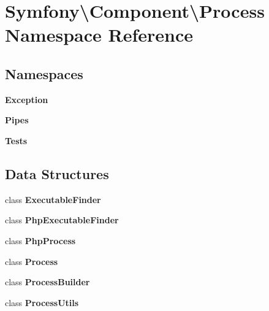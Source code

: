 \section{Symfony\textbackslash{}Component\textbackslash{}Process Namespace Reference}
\label{namespace_symfony_1_1_component_1_1_process}
\subsection*{Namespaces}
\begin{DoxyCompactItemize}
\item 
 {\bf Exception}
\item 
 {\bf Pipes}
\item 
 {\bf Tests}
\end{DoxyCompactItemize}
\subsection*{Data Structures}
\begin{DoxyCompactItemize}
\item 
class {\bf Executable\+Finder}
\item 
class {\bf Php\+Executable\+Finder}
\item 
class {\bf Php\+Process}
\item 
class {\bf Process}
\item 
class {\bf Process\+Builder}
\item 
class {\bf Process\+Utils}
\end{DoxyCompactItemize}
